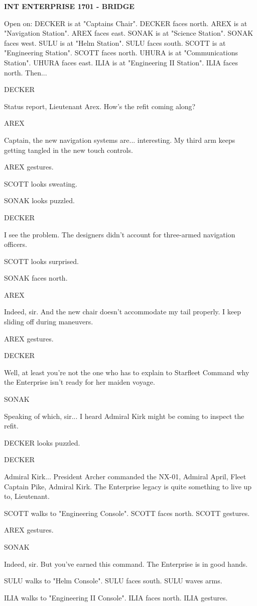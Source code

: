 \documentclass[11pt,letterpaper,oldstylefigures]{memoir}
\newcommand{\slugline}[1]{\nobreak\textbf{\MakeUppercase{#1}}\par\nobreak\vspace{1\baselineskip}}
\newcommand{\speaker}[1]{\nobreak\hspace*{0.333\textwidth}\MakeUppercase{#1}\par\nobreak\vspace{0.5\baselineskip}}
\newcommand{\dialogue}[1]{\nobreak\hspace*{0.25\textwidth}\begin{minipage}{0.5\textwidth}#1\end{minipage}\par\vspace{1\baselineskip}}
\newcommand{\stagedir}[1]{#1\par\vspace{1\baselineskip}}
\newenvironment{FountainExample}
  {\begingroup
  \ttfamily\small
   \setlength{\parindent}{0pt}
  \setlength{\parskip}{0.5em}
  \allowdisplaybreaks
  \setlength{\displaywidowpenalty}{0}
  \setlength{\widowpenalty}{0}
  \setlength{\clubpenalty}{0}
  \setlength{\interlinepenalty}{0}
}
  {\endgroup}
\begin{document}
\begin{FountainExample}
\slugline{INT ENTERPRISE 1701 - BRIDGE}

\stagedir{Open on: DECKER is at "Captains Chair". DECKER faces north. AREX is at "Navigation Station". AREX faces east. SONAK is at "Science Station". SONAK faces west. SULU is at "Helm Station". SULU faces south. SCOTT is at "Engineering Station". SCOTT faces north. UHURA is at "Communications Station". UHURA faces east. ILIA is at "Engineering II Station". ILIA faces north. Then...}


\speaker{DECKER}
\dialogue{Status report, Lieutenant Arex. How's the refit coming along?}

\speaker{AREX}
\dialogue{Captain, the new navigation systems are... interesting. My third arm keeps getting tangled in the new touch controls.}

\stagedir{AREX gestures.}
\stagedir{SCOTT looks sweating.}
\stagedir{SONAK looks puzzled.}

\speaker{DECKER}
\dialogue{I see the problem. The designers didn't account for three-armed navigation officers.}

\stagedir{SCOTT looks surprised.}
\stagedir{SONAK faces north.}

\speaker{AREX}
\dialogue{Indeed, sir. And the new chair doesn't accommodate my tail properly. I keep sliding off during maneuvers.}

\stagedir{AREX gestures.}

\speaker{DECKER}
\dialogue{Well, at least you're not the one who has to explain to Starfleet Command why the Enterprise isn't ready for her maiden voyage.}

\speaker{SONAK}
\dialogue{Speaking of which, sir... I heard Admiral Kirk might be coming to inspect the refit.}

\stagedir{DECKER looks puzzled.}

\speaker{DECKER}
\dialogue{Admiral Kirk... President Archer commanded the NX-01, Admiral April, Fleet Captain Pike, Admiral Kirk. The Enterprise legacy is quite something to live up to, Lieutenant.}

\stagedir{SCOTT walks to "Engineering Console". SCOTT faces north. SCOTT gestures.}
\stagedir{AREX gestures.}

\speaker{SONAK}
\dialogue{Indeed, sir. But you've earned this command. The Enterprise is in good hands.}

\stagedir{SULU walks to "Helm Console". SULU faces south. SULU waves arms.}
\stagedir{ILIA walks to "Engineering II Console". ILIA faces north. ILIA gestures.}


\end{FountainExample}
\end{document}
